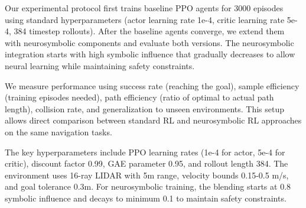 \documentclass[pdflatex,sn-mathphys-num]{sn-jnl}
\theoremstyle{thmstyleone}%
\theoremstyle{thmstyletwo}%
\theoremstyle{thmstylethree}%
\begin{document}
Our experimental protocol first trains baseline PPO agents for 3000 episodes using standard hyperparameters (actor learning rate 1e-4, critic learning rate 5e-4, 384 timestep rollouts). After the baseline agents converge, we extend them with neurosymbolic components and evaluate both versions. The neurosymbolic integration starts with high symbolic influence that gradually decreases to allow neural learning while maintaining safety constraints.

We measure performance using success rate (reaching the goal), sample efficiency (training episodes needed), path efficiency (ratio of optimal to actual path length), collision rate, and generalization to unseen environments. This setup allows direct comparison between standard RL and neurosymbolic RL approaches on the same navigation tasks.

The key hyperparameters include PPO learning rates (1e-4 for actor, 5e-4 for critic), discount factor 0.99, GAE parameter 0.95, and rollout length 384. The environment uses 16-ray LIDAR with 5m range, velocity bounds 0.15-0.5 m/s, and goal tolerance 0.3m. For neurosymbolic training, the blending starts at 0.8 symbolic influence and decays to minimum 0.1 to maintain safety constraints.
\end{document}
